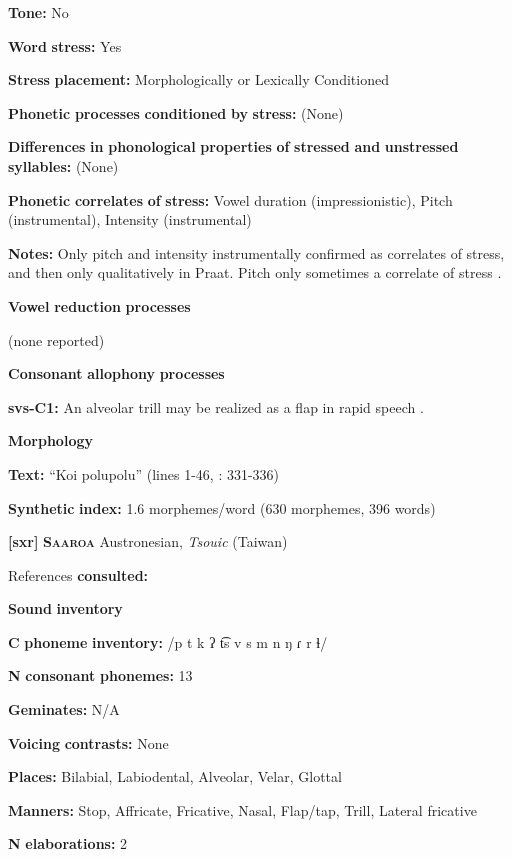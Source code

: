 \textbf{Tone:} No

\textbf{Word} \textbf{stress:} Yes

\textbf{Stress} \textbf{placement:} Morphologically or Lexically Conditioned

\textbf{Phonetic} \textbf{processes} \textbf{conditioned} \textbf{by} \textbf{stress:} (None)

\textbf{Differences} \textbf{in} \textbf{phonological} \textbf{properties} \textbf{of} \textbf{stressed} \textbf{and} \textbf{unstressed} \textbf{syllables:} (None)

\textbf{Phonetic} \textbf{correlates} \textbf{of} \textbf{stress:} Vowel duration (impressionistic), Pitch (instrumental), Intensity (instrumental)

\textbf{Notes:} Only pitch and intensity instrumentally confirmed as correlates of stress, and then only qualitatively in Praat. Pitch only sometimes a correlate of stress \citet[24]{Wegener2008}.

\textbf{Vowel} \textbf{reduction} \textbf{processes}

(none reported)

\textbf{Consonant} \textbf{allophony} \textbf{processes}

\textbf{svs-C1:} An alveolar trill may be realized as a flap in rapid speech \citep[17]{Wegener2008}.

\textbf{Morphology}

\textbf{Text:} “Koi polupolu” (lines 1-46, \citealt{Wegener2008}: 331-336)

\textbf{Synthetic} \textbf{index:} 1.6 morphemes/word (630 morphemes, 396 words)

\textbf{[sxr]}   \textbf{\textsc{Saaroa}  }  Austronesian, \textit{Tsouic} (Taiwan)

References \textbf{consulted:} \citet{Pan2012}

\textbf{Sound} \textbf{inventory}

\textbf{C} \textbf{phoneme} \textbf{inventory:} /p t k ʔ t͡s v s m n ŋ ɾ r ɬ/

\textbf{N} \textbf{consonant} \textbf{phonemes:} 13

\textbf{Geminates:} N/A

\textbf{Voicing} \textbf{contrasts:} None

\textbf{Places:} Bilabial, Labiodental, Alveolar, Velar, Glottal

\textbf{Manners:} Stop, Affricate, Fricative, Nasal, Flap/tap, Trill, Lateral fricative

\textbf{N} \textbf{elaborations:} 2


